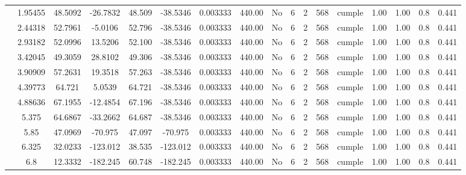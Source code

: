 \begin{table}[H]
{\begin{tabular}{|c|c|c|c|c|c|c|c|c|c|c|c|c|c|c|c|c|}
\cline{2-17}        & 1.95455 & 48.5092 & -26.7832 & 48.509 & -38.5346 & 0.003333 & 440.00 & No  & 6   & 2   & 568 & \cellcolor[rgb]{ .776,  .937,  .808}cumple & 1.00 & 1.00 & 0.8 & 0.441 \bigstrut\\
\cline{2-17}        & 2.44318 & 52.7961 & -5.0106 & 52.796 & -38.5346 & 0.003333 & 440.00 & No  & 6   & 2   & 568 & \cellcolor[rgb]{ .776,  .937,  .808}cumple & 1.00 & 1.00 & 0.8 & 0.441 \bigstrut\\
\cline{2-17}        & 2.93182 & 52.0996 & 13.5206 & 52.100 & -38.5346 & 0.003333 & 440.00 & No  & 6   & 2   & 568 & \cellcolor[rgb]{ .776,  .937,  .808}cumple & 1.00 & 1.00 & 0.8 & 0.441 \bigstrut\\
\cline{2-17}        & 3.42045 & 49.3059 & 28.8102 & 49.306 & -38.5346 & 0.003333 & 440.00 & No  & 6   & 2   & 568 & \cellcolor[rgb]{ .776,  .937,  .808}cumple & 1.00 & 1.00 & 0.8 & 0.441 \bigstrut\\
\cline{2-17}        & 3.90909 & 57.2631 & 19.3518 & 57.263 & -38.5346 & 0.003333 & 440.00 & No  & 6   & 2   & 568 & \cellcolor[rgb]{ .776,  .937,  .808}cumple & 1.00 & 1.00 & 0.8 & 0.441 \bigstrut\\
\cline{2-17}        & 4.39773 & 64.721 & 5.0539 & 64.721 & -38.5346 & 0.003333 & 440.00 & No  & 6   & 2   & 568 & \cellcolor[rgb]{ .776,  .937,  .808}cumple & 1.00 & 1.00 & 0.8 & 0.441 \bigstrut\\
\cline{2-17}        & 4.88636 & 67.1955 & -12.4854 & 67.196 & -38.5346 & 0.003333 & 440.00 & No  & 6   & 2   & 568 & \cellcolor[rgb]{ .776,  .937,  .808}cumple & 1.00 & 1.00 & 0.8 & 0.441 \bigstrut\\
\cline{2-17}        & 5.375 & 64.6867 & -33.2662 & 64.687 & -38.5346 & 0.003333 & 440.00 & No  & 6   & 2   & 568 & \cellcolor[rgb]{ .776,  .937,  .808}cumple & 1.00 & 1.00 & 0.8 & 0.441 \bigstrut\\
\cline{2-17}        & 5.85 & 47.0969 & -70.975 & 47.097 & -70.975 & 0.003333 & 440.00 & No  & 6   & 2   & 568 & \cellcolor[rgb]{ .776,  .937,  .808}cumple & 1.00 & 1.00 & 0.8 & 0.441 \bigstrut\\
\cline{2-17}        & 6.325 & 32.0233 & -123.012 & 38.535 & -123.012 & 0.003333 & 440.00 & No  & 6   & 2   & 568 & \cellcolor[rgb]{ .776,  .937,  .808}cumple & 1.00 & 1.00 & 0.8 & 0.441 \bigstrut\\
\cline{2-17}        & \cellcolor[rgb]{ .851,  .882,  .949}6.8 & 12.3332 & -182.245 & 60.748 & -182.245 & 0.003333 & 440.00 & No  & 6   & 2   & 568 & \cellcolor[rgb]{ .776,  .937,  .808}cumple & 1.00 & 1.00 & 0.8 & 0.441 \bigstrut\\

\end{tabular}}
\end{table}

